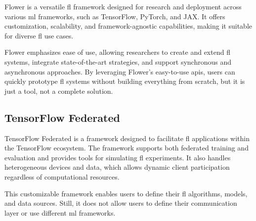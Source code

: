 Flower is a versatile \ac{fl} framework designed for research and deployment across various \ac{ml} frameworks, such as TensorFlow, PyTorch, and JAX. It offers customization, scalability, and framework-agnostic capabilities, making it suitable for diverse \ac{fl} use cases.

Flower emphasizes ease of use, allowing researchers to create and extend \ac{fl} systems, integrate state-of-the-art strategies, and support synchronous and asynchronous approaches. By leveraging Flower's easy-to-use \acp{api}, users can quickly prototype \ac{fl} systems without building everything from scratch, but it is just a tool, not a complete solution.

\subsection{TensorFlow Federated}
\label{sec:tff}

TensorFlow Federated is a framework designed to facilitate \ac{fl} applications within the TensorFlow ecosystem. The framework supports both federated training and evaluation and provides tools for simulating \ac{fl} experiments. It also handles heterogeneous devices and data, which allows dynamic client participation regardless of computational resources. 

This customizable framework enables users to define their \ac{fl} algorithms, models, and data sources. Still, it does not allow users to define their communication layer or use different \ac{ml} frameworks.

